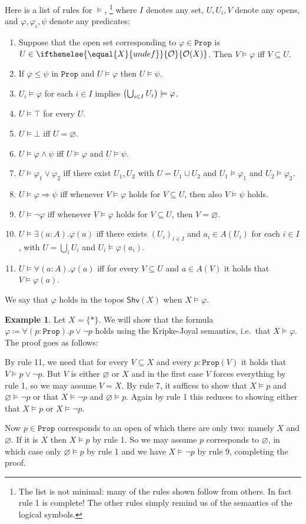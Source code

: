\documentclass[reqno,11pt]{amsproc}
\theoremstyle{plain}
\theoremstyle{definition}
\newtheorem{example}[theorem]{Example}
\newcommand{\Const}[1]{\mathtt{#1}}
\newcommand{\cat}[1]{\mathsf{#1}}
\newcommand{\shv}{\cat{Shv}}
\newcommand{\prop}{\Const{Prop}}
\newcommand{\Op}[1][undef]{\ifthenelse{\equal{#1}{undef}}{\mathcal{O}}{\mathcal{O}(#1)}}
\newcommand{\imp}{\Rightarrow}
\newcommand{\true}{\top}
\newcommand{\false}{\bot}
\let\originalleft\left
\let\originalright\right
\renewcommand{\left}{\mathopen{}\mathclose\bgroup\originalleft}
\renewcommand{\right}{\aftergroup\egroup\originalright}
\numberwithin{equation}{section}
\begin{document}
Here is a list of rules for $\models$,%
\footnote{The list is not minimal: many of the rules shown follow from others. In fact rule 1 is complete! The other rules simply remind us of the semantics of the logical symbols.
}
where $I$ denotes any set, $U, U_i, V$ denote any opens, and $\varphi,\varphi_i,\psi$ denote any predicates:
\begin{enumerate}
	\item Suppose that the open set corresponding to $\varphi\in\prop$ is $U\in\Op[X]$. Then $V\models\varphi$ iff $V\subseteq U$.
  \item If $\varphi\leq\psi$ in $\prop$ and $U\models\varphi$ then $U\models\psi$.
  \item $U_i\models\varphi$ for each $i\in I$ implies $\left(\bigcup_{i\in I}U_i\right)\models\varphi$.
  \item $U\models\true$ for every $U$.
  \item $U\models\false$ iff $U=\varnothing$.
  \item $U\models\varphi\wedge\psi$ iff $U\models\varphi$ and $U\models\psi$.
  \item $U\models\varphi_1\vee\varphi_2$ iff there exist $U_1,U_2$ with $U=U_1\cup U_2$ and $U_1\models\varphi_1$ and $U_2\models\varphi_2$.
  \item $U\models \varphi\imp\psi$ iff whenever $V\models\varphi$ holds for $V\subseteq U$, then also $V\models\psi$ holds.
  \item $U\models\neg\varphi$ iff whenever $V\models\varphi$ holds for $V\subseteq U$, then $V=\varnothing$.
  \item $U\models\exists (a:A).\varphi(a)$ iff there exists $(U_i)_{i\in I}$ and $a_i\in A(U_i)$ for each $i\in I$, with $U=\bigcup_iU_i$ and $U_i\models\varphi(a_i)$.
  \item $U\models\forall (a:A).\varphi(a)$ iff for every $V\subseteq U$ and $a\in A(V)$ it holds that $V\models \varphi(a)$.
\end{enumerate}
We say that $\varphi$ holds in the topos $\shv(X)$ when $X\models\varphi$.


\begin{example}
Let $X=\{*\}$. We will show that the formula $\varphi\coloneqq\forall (p:\prop).p\vee\neg p$ holds using the Kripke-Joyal semantics, i.e.\ that $X\models\varphi$. The proof goes as follows:

By rule 11, we need that for every $V\subseteq X$ and every $p:\prop(V)$ it holds that $V\models p\vee\neg p$. But $V$ is either $\varnothing$ or $X$ and in the first case $V$ forces everything by rule 1, so we may assume $V=X$. By rule 7, it suffices to show that $X\models p$ and $\varnothing\models\neg p$ or that $X\models\neg p$ and $\varnothing\models p$. Again by rule 1 this reduces to showing either that $X\models p$ or $X\models\neg p$.

Now $p\in\prop$ corresponds to an open of which there are only two: namely $X$ and $\varnothing$. If it is $X$ then $X\models p$ by rule 1. So we may assume $p$ corresponds to $\varnothing$, in which case only $\varnothing\models p$ by rule 1 and we have $X\models\neg p$ by rule 9, completing the proof.
\end{example}
\end{document}
